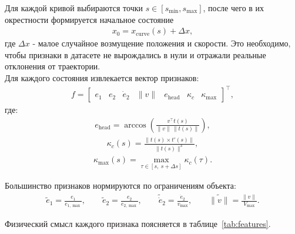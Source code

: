 Для каждой кривой выбираются точки $s \in [s_{\min}, s_{\max}]$, после чего в их окрестности формируется начальное состояние
\begin{gather}
    x_0 = x_{\mathrm{curve}}(s) + \Delta x,
\end{gather}
где $\Delta x$ - малое случайное возмущение положения и скорости.
Это необходимо, чтобы признаки в датасете не вырождались в нули и отражали реальные отклонения от траектории.\\
Для каждого состояния извлекается вектор признаков:
\begin{gather}
    f =
    \begin{bmatrix}
        e_1 &
        e_2 &
        \dot{e}_2 &
        \|v\| &
        e_{\mathrm{head}} &
        \kappa_c &
        \kappa_{\max}
    \end{bmatrix}^{\top},
\end{gather}
где:
\begin{gather}
    e_{\mathrm{head}} = \arccos\left(
        \frac{v^{\top} t(s)}{\|v\| \, \|t(s)\|}
    \right),
\end{gather}
\begin{gather}
    \kappa_c(s) =
    \frac{\|t(s) \times t'(s)\|}{\|t(s)\|^3},
\end{gather}
\begin{gather}
    \kappa_{\max}(s) = \max_{\tau \in [s,\ s+\Delta s]} \kappa_c(\tau).
\end{gather}

Большинство признаков нормируются по ограничениям объекта:
\begin{gather}
    \tilde{e}_1 = \frac{e_1}{e_{1,\max}}, \qquad
    \tilde{e}_2 = \frac{e_2}{e_{2,\max}}, \qquad
    \tilde{\dot{e}}_2 = \frac{\dot{e}_2}{v_{\max}}, \qquad
    \widetilde{\|v\|} = \frac{\|v\|}{V_{\max}}.
\end{gather}

Физический смысл каждого признака поясняется в таблице~\ref{tab:features}.

